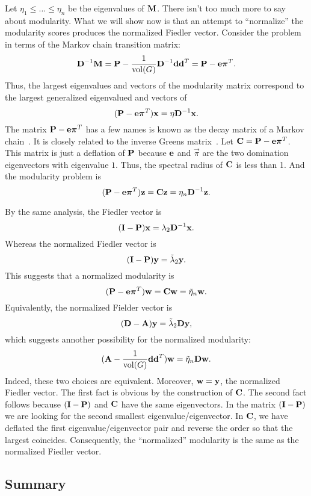\documentclass[nofonts]{dgleich-article}
\DeclareMathOperator{\vol}{vol}
\newcommand{\tlambda}{\tilde{\lambda}}
\newcommand{\teta}{\tilde{\eta}}
\renewcommand{\vpi}{\vec{\pi}}
\begin{document}
Let $\eta_1 \le \ldots \le \eta_n$ be the eigenvalues of $\boldsymbol{\mathrm{M}}$.  There
isn't too much more to say about modularity.  What we will show now
is that an attempt to ``normalize'' the modularity scores produces
the normalized Fiedler vector.  Consider the problem in terms
of the Markov chain transition matrix: 
\[ \mD^{-1} \mM = \mP - \frac{1}{\vol(G)} \mD^{-1} \vd \vd^T = \mP - \ve \vpi^T. \]
Thus, the largest eigenvalues and vectors of the modularity matrix correspond
to the largest generalized eigenvalued and vectors of 
\[ (\mP - \ve \vpi^T) \vx = \eta \mD^{-1} \vx. \]
The matrix $\mP - \ve \vpi^T$ has a few names is known as
the decay matrix of a Markov chain~\cite{jonsson1997-cutoff}.
It is closely related to the inverse Greens 
matrix~\cite{ollivier2007-greens}.  Let $\mC = \mP - \ve \vpi^T$.
This matrix is just a deflation of $\boldsymbol{\mathrm{P}}$ because $\boldsymbol{\mathrm{e}}$ and $\vpi$
are the two domination eigenvectors with eigenvalue $1$.
Thus, the spectral radius of $\boldsymbol{\mathrm{C}}$ is less than 1.  And 
the modularity problem is 
\[ (\mP - \ve \vpi^T) \vz = \mC \vz = \eta_n \mD^{-1} \vz. \]

By the same analysis, the Fiedler vector is 
\[ (\boldsymbol{\mathrm{I}} - \boldsymbol{\mathrm{P}}) \boldsymbol{\mathrm{x}} = \lambda_{2} \boldsymbol{\mathrm{D}}^{-1} \boldsymbol{\mathrm{x}}. \]
Whereas the normalized Fiedler vector is 
\[ (\eye - \mP) \vy = \tlambda_2 \vy. \]
This suggests that a normalized modularity is 
\[ (\mP - \ve \vpi^T) \vw = \mC \vw = \teta_n \vw. \]
Equivalently, the normalized Fielder vector is 
\[ (\mD - \mA) \vy = \tlambda_2 \mD \vy,\]
which suggests annother possibility for the normalized modularity: 
\[ (\mA - \frac{1}{\vol(G)} \vd \vd^T) \vw = \teta_n \mD \vw. \]
Indeed, these two choices are equivalent.  Moreover, $\boldsymbol{\mathrm{w}} = \boldsymbol{\mathrm{y}}$, 
the normalized Fiedler vector.  The first fact is obvious 
by the construction of $\boldsymbol{\mathrm{C}}$.  The second fact follows because
$(\boldsymbol{\mathrm{I}} - \boldsymbol{\mathrm{P}})$ and $\boldsymbol{\mathrm{C}}$ have the same eigenvectors.  In the matrix
$(\boldsymbol{\mathrm{I}} - \boldsymbol{\mathrm{P}})$ we are looking for the second smallest eigenvalue/eigenvector.  
In $\boldsymbol{\mathrm{C}}$, we have deflated the first eigenvalue/eigenvector pair and reverse
the order so that the largest coincides.  Consequently, 
the ``normalized'' modularity is the same as the normalized Fiedler vector.  

\subsection{Summary}
\end{document}
